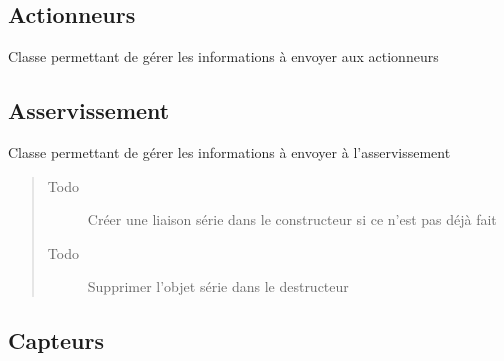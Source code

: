\documentclass[letterpaper,10pt,french]{sphinxmanual}
\begin{document}
\subsection{Actionneurs}
\label{actions:id1}\label{actions:module-lib.actions_out.actionneurs_out}

\begin{fulllineitems}
\label{actions:lib.actions_out.actionneurs_out.Actionneurs_out}
Classe permettant de gérer les informations à envoyer aux actionneurs

\end{fulllineitems}



\subsection{Asservissement}
\label{actions:id2}\label{actions:module-lib.actions_out.asservissement_out}

\begin{fulllineitems}
\label{actions:lib.actions_out.asservissement_out.Asservissement_out}
Classe permettant de gérer les informations à envoyer à l'asservissement
\begin{quote}\begin{description}
\item[{Todo }] \leavevmode
Créer une liaison série dans le constructeur si ce n'est pas déjà fait

\item[{Todo }] \leavevmode
Supprimer l'objet série dans le destructeur

\end{description}\end{quote}

\end{fulllineitems}



\subsection{Capteurs}
\label{actions:id3}\label{actions:module-lib.actions_out.capteurs_out}
\end{document}
